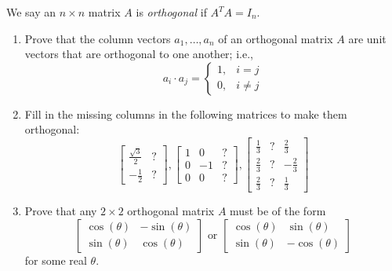 \begin{exercise} \label{e1.4.34}
    We say an \( n \times n \) matrix \( A \) is \emph{orthogonal} if \( A^TA = I_n \).
    
    \begin{enumerate}
        \item Prove that the column vectors \( a_1, \ldots, a_n \) of an orthogonal matrix \( A \) are unit vectors that are orthogonal to one another; i.e.,
        \[ a_i \cdot a_j = \begin{cases} 1, &i=j \\ 0, &i\neq j \end{cases} \]
        
        \item Fill in the missing columns in the following matrices to make them orthogonal:
        \[
            \begin{bmatrix}
                \frac{\sqrt{3}}{2} & ? \\ 
                -\frac{1}{2} & ? 
            \end{bmatrix},
            \begin{bmatrix}
                1 & 0 & ? \\ 
                0 & -1 & ? \\ 
                0 & 0 & ?
            \end{bmatrix},
            \begin{bmatrix}
                \frac{1}{3} & ? & \frac{2}{3} \\
                \frac{2}{3} & ? & -\frac{2}{3} \\
                \frac{2}{3} & ? & \frac{1}{3}
            \end{bmatrix}
        \]
        
        \item Prove that any \( 2 \times 2 \) orthogonal matrix \( A \) must be of the form
        \[
            \begin{bmatrix}
                \cos(\theta) & -\sin(\theta) \\
                \sin(\theta) & \cos(\theta)
            \end{bmatrix}
            \text{ or }
            \begin{bmatrix}
                \cos(\theta) & \sin(\theta) \\
                \sin(\theta) & -\cos(\theta)
            \end{bmatrix}
        \]
        for some real \( \theta \).
        

\end{enumerate}
\end{exercise}
